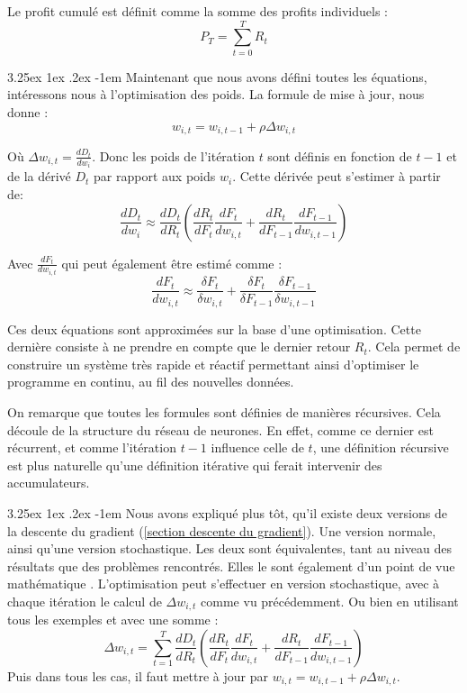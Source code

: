 \documentclass[a4paper, 11pt]{article}
\makeatletter
\renewcommand\paragraph{\@startsection{paragraph}{5}{\z@}%
  {3.25ex \@plus1ex \@minus.2ex}%
  {-1em}%
  {\normalfont\normalsize\bfseries}}
\makeatother
\begin{document}
Le profit cumulé est définit comme la somme des profits individuels :
$$P_T = \sum_{t=0}^T R_t$$

\paragraph{}
Maintenant que nous avons défini toutes les équations, intéressons nous à l'optimisation des poids. La formule de mise à jour, nous donne :
$$w_{i,t} = w_{i,t-1} + \rho \Delta w_{i,t}$$

Où $\Delta w_{i,t} = \frac{dD_t}{dw_i}$. Donc les poids de l'itération $t$ sont définis en fonction de $t-1$ et de la dérivé $D_t$ par rapport aux poids
$w_i$. Cette dérivée peut s'estimer à partir de:
$$\frac{dD_t}{dw_i} \approx \frac{dD_t}{dR_t} (\frac{dR_t}{dF_t} \frac{dF_t}{dw_{i,t}} + \frac{dR_t}{dF_{t-1}} \frac{dF_{t-1}}{dw_{i,t-1}})$$

Avec $\frac{dF_t}{dw_{i,t}}$ qui peut également être estimé comme :
$$\frac{dF_t}{dw_{i,t}} \approx \frac{\delta F_t}{\delta w_{i,t}} + \frac{\delta F_t}{\delta F_{t-1}} \frac{\delta F_{t-1}}{\delta w_{i,t-1}}$$

Ces deux équations sont approximées sur la base d'une optimisation\cite{learning_to_trade}. Cette dernière consiste à ne prendre en compte que le dernier retour $R_t$. Cela permet de construire un système très rapide et réactif permettant ainsi d'optimiser le programme en continu, au fil des nouvelles données.

On remarque que toutes les formules sont définies de manières récursives. Cela découle de la structure du réseau de neurones. En effet, comme ce dernier est
récurrent, et comme l'itération $t-1$ influence celle de $t$, une définition récursive est plus naturelle qu'une définition itérative qui ferait intervenir
des accumulateurs.

\paragraph{}
Nous avons expliqué plus tôt, qu'il existe deux versions de la descente du gradient (\ref{section descente du gradient}). Une version normale, ainsi qu'une
version stochastique.
Les deux sont équivalentes, tant au niveau des résultats que des problèmes rencontrés\cite{learning_to_trade}. Elles le sont également d'un point de vue mathématique
\cite{learning_to_trade}.
L'optimisation peut s'effectuer en version stochastique, avec à chaque itération le calcul de $\Delta w_{i,t}$ comme vu précédemment.
Ou bien en utilisant tous les exemples et avec une somme :
$$\Delta w_{i,t} = \sum_{t=1}^T \frac{dD_t}{dR_t} (\frac{dR_t}{dF_t} \frac{dF_t}{dw_{i,t}} + \frac{dR_t}{dF_{t-1}} \frac{dF_{t-1}}{dw_{i,t-1}})$$
Puis dans tous les cas, il faut mettre à jour par $w_{i,t} = w_{i,t-1} + \rho \Delta w_{i,t}$.
\end{document}
